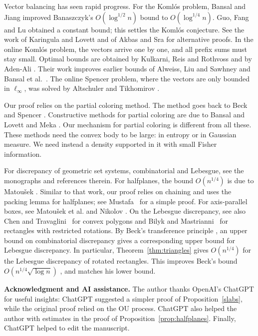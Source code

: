 \documentclass[12pt,reqno]{amsart}
\numberwithin{equation}{section}
\begin{document}
Vector balancing has seen rapid progress. For the Koml\'os problem, Bansal and Jiang \cite{BansalJiang} improved Banaszczyk's \(O(\log^{1/2}n)\) bound to \(O(\log^{1/4}n)\). Guo, Fang and Lu \cite{GFL} obtained a constant bound; this settles the Koml\'os conjecture. See the work of Karingula and Lovett \cite{KarLov} and of Akbas and Sra \cite{AkbasSra-1, AkbasSra-2} for alternative proofs. In the online Koml\'os problem, the vectors arrive one by one, and all prefix sums must stay small. Optimal bounds are obtained by Kulkarni, Reis and Rothvoss \cite{Kulk-Reis-Roth} and by Aden-Ali \cite{AdenAli}. Their work improves earlier bounds of Alweiss, Liu and Sawhney \cite{AL-Saw} and Bansal et al.\ \cite{Bans-JMSS}. The online Spencer problem, where the vectors are only bounded in \(\ell_\infty\), was solved by Altschuler and Tikhomirov \cite{AltTikh-1}.
\smallskip%

Our proof relies on the partial coloring method. The method goes back to Beck \cite{Beck-3} and Spencer \cite{Spencer-6}. Constructive methods for partial coloring are due to Bansal \cite{Bansal-10} and Lovett and Meka \cite{LovMeka}. Our mechanism for partial coloring is different from all these. These methods need the convex body to be large: in entropy or in Gaussian measure. We need instead a density supported in it with small Fisher information.
\smallskip%

For discrepancy of geometric set systems, combinatorial and Lebesgue, see the monographs \cite{Mat, Chaz, Beck-Chen} and references therein. For halfplanes, the bound \(O(n^{1/4})\) is due to Matou\v{s}ek \cite{Mat-halfspaces}. Similar to that work, our proof relies on chaining and uses the packing lemma for halfplanes; see Mustafa~\cite{Mustafa} for a simple proof. For axis-parallel boxes, see Matou\v{s}ek et al. \cite{MNT} and 
Nikolov \cite{Nikolov}. On the Lebesgue discrepancy, see also Chen and Travaglini~\cite{ChenTrav} for convex polygons and Bilyk and Mastrianni~\cite{BilykMast} for rectangles with restricted rotations. By Beck's transference principle \cite{Beck-1}, an upper bound on combinatorial discrepancy gives a corresponding upper bound for Lebesgue discrepancy. In particular, Theorem~\ref{thm:triangles} gives \(O(n^{1/4})\) for the Lebesgue discrepancy of rotated rectangles. This improves Beck's bound \(O(n^{1/4}\sqrt{\log n})\) \cite{Beck-Chen}, and matches his lower bound.
\smallskip%

\textbf{Acknowledgment and AI assistance.} 
The author thanks OpenAI's ChatGPT for useful insights: ChatGPT suggested a simpler proof of Proposition~\ref{slabs}, while the original proof relied on the OU process. ChatGPT also helped the author with estimates in the proof of Proposition~\ref{prop:halfplanes}. Finally, ChatGPT helped to edit the manuscript.
\end{document}
